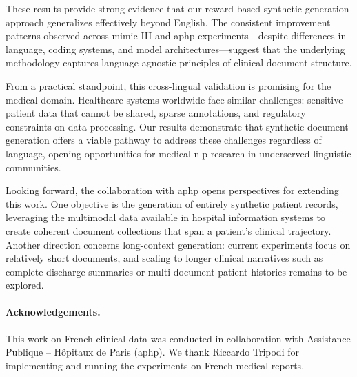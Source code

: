 These results provide strong evidence that our reward-based synthetic generation approach generalizes effectively beyond English.
The consistent improvement patterns observed across \gls{mimic}-III and \gls{aphp} experiments---despite differences in language, coding systems, and model architectures---suggest that the underlying methodology captures language-agnostic principles of clinical document structure.

From a practical standpoint, this cross-lingual validation is promising for the medical domain.
Healthcare systems worldwide face similar challenges: sensitive patient data that cannot be shared, sparse annotations, and regulatory constraints on data processing.
Our results demonstrate that synthetic document generation offers a viable pathway to address these challenges regardless of language, opening opportunities for medical \gls{nlp} research in underserved linguistic communities.

Looking forward, the collaboration with \gls{aphp} opens perspectives for extending this work.
One objective is the generation of entirely synthetic patient records, leveraging the multimodal data available in hospital information systems to create coherent document collections that span a patient's clinical trajectory.
Another direction concerns long-context generation: current experiments focus on relatively short documents, and scaling to longer clinical narratives such as complete discharge summaries or multi-document patient histories remains to be explored.

\paragraph{Acknowledgements.}
This work on French clinical data was conducted in collaboration with Assistance Publique -- Hôpitaux de Paris (\gls{aphp}).
We thank Riccardo Tripodi for implementing and running the experiments on French medical reports.
